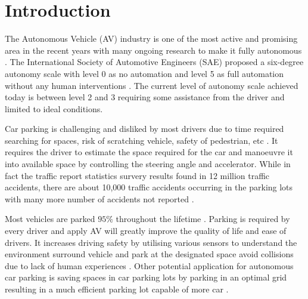 \documentclass{svproc}
\begin{document}
\section{Introduction}
\label{sec:introduction}
%
%
The Autonomous Vehicle (AV) industry is one of the most active and promising area in the recent years with many ongoing research to make it fully autonomous \cite{talavera2021autonomous}. The International Society of Automotive Engineers (SAE) proposed a six-degree autonomy scale with level 0 as no automation and level 5 as full automation without any human interventions \cite{stoma2021future}. The current level of autonomy scale achieved today is between level 2 and 3 requiring some assistance from the driver and limited to ideal conditions.

Car parking is challenging and disliked by most drivers due to time required searching for spaces, risk of scratching vehicle, safety of pedestrian, etc \cite{baburaj2021smart}\cite{bosch_global_2022}. It requires the driver to estimate the space required for the car and manoeuvre it into available space by controlling the steering angle and accelerator. While in fact the traffic report statistics survery results found in 12 million traffic accidents, there are about 10,000 traffic accidents occurring in the parking lots with many more number of accidents not reported \cite{wang2014automatic}.

Most vehicles are parked $95\%$ throughout the lifetime \cite{choi2019self}. Parking is required by every driver and apply AV will greatly improve the quality of life and ease of drivers. It increases driving safety by utilising various sensors to understand the environment surround vehicle and park at the designated space avoid collisions due to lack of human experiences \cite{wang2014automatic}. Other potential application for autonomous car parking is saving spaces in car parking lots by parking in an optimal grid resulting in a much efficient parking lot capable of more car \cite{choi2019self}.
\end{document}
